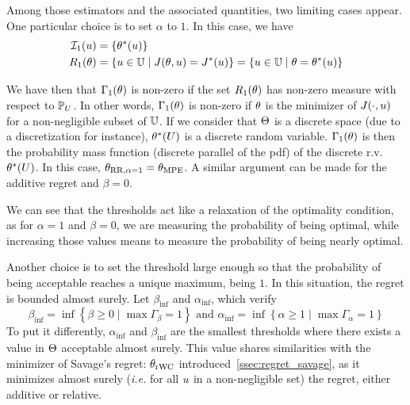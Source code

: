 \documentclass[../../Main_ManuscritThese.tex]{subfiles}
\begin{document}
  
  Among those estimators and the associated quantities, two limiting cases appear. One particular choice is to set $\alpha$ to $1$. In this case, we have
\begin{align}
  \mathcal{I}_{1}(u) &= \{\theta^*(u)\} \\
  R_1(\theta) &= \left\{u\in\mathbb{U} \mid J(\theta, u) = J^*(u)\right\} = \left\{u\in\mathbb{U} \mid \theta = \theta^*(u)\right\}
\end{align}

We have then that $\Gamma_1(\theta)$ is non-zero if the set $R_1(\theta)$ has non-zero measure with respect to $\mathbb{P}_{U}$. In other words, $\Gamma_1(\theta)$ is non-zero if $\theta$ is the minimizer of $J(\cdot,u)$ for a non-negligible subset of $\mathbb{U}$.
If we consider that $\Theta$ is a discrete space (due to a discretization for instance), $\theta^*(U)$ is a discrete random variable. $\Gamma_1(\theta)$ is then the probability mass function (discrete parallel of the pdf) of the discrete r.v.\ $\theta^*(U)$.
In this case, ${\theta}_{\mathrm{RR, \alpha=1}}= {\theta}_{\mathrm{MPE}}$.
A similar argument can be made for the additive regret and $\beta=0$.

We can see that the thresholds act like a relaxation of the optimality condition, as for $\alpha=1$ and $\beta=0$, we are measuring the probability of being optimal, while increasing those values means to measure the probability of being nearly optimal.


Another choice is to set the threshold large enough so that the probability of being acceptable reaches a unique maximum, being $1$. In this situation, the regret is bounded almost surely.
Let $\beta_{\inf{}}$ and $\alpha_{\inf{}}$, which verify
\begin{equation}
  \beta_{\inf{}}=\inf \left\{\beta \geq 0 \mid \max \Gamma_{\beta} = 1\right\} \text{ and }\alpha_{\inf{}}= \inf \left\{\alpha \geq 1 \mid \max \Gamma_{\alpha} = 1\right\}
\end{equation}
To put it differently, $\alpha_{\inf{}}$ and $\beta_{\inf{}}$ are the smallest thresholds where there exists a value in $\Theta$ acceptable almost surely. This value shares similarities with the minimizer of Savage's regret: ${\theta}_{\mathrm{rWC}}$ introduced~\cref{ssec:regret_savage}, as it minimizes almost surely (\emph{i.e.} for all $u$ in a non-negligible set) the regret, either additive or relative.



\end{document}
